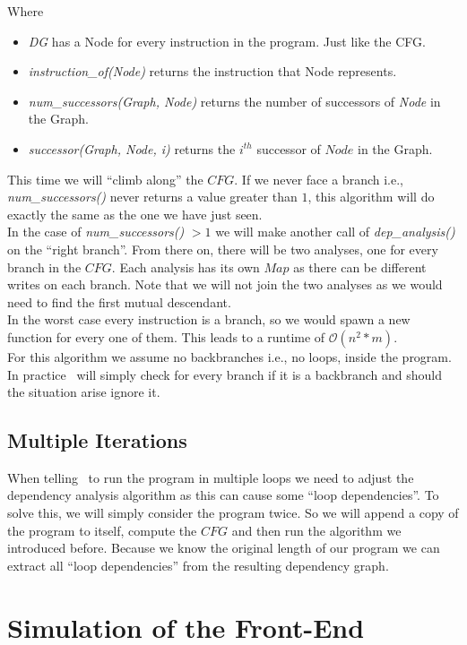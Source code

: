 Where
\begin{itemize}
    \item \emph{DG} has a Node for every instruction in the program. Just like the CFG.
    \item \emph{instruction\_of(Node)} returns the instruction that Node represents.
    \item \emph{num\_successors(Graph, Node)} returns the number of successors of \emph{Node} in the Graph.
    \item \emph{successor(Graph, Node, i)} returns the $i^{th}$ successor of $Node$ in the Graph.
\end{itemize}

This time we will ``climb along'' the $CFG$. If we never face a branch i.e., \emph{num\_successors()} never returns a value greater than $1$, this algorithm will do exactly the same as the one we have just seen.\\
In the case of \emph{num\_successors()} $> 1$ we will make another call of \emph{dep\_analysis()} on the ``right branch''. From there on, there will be two analyses, one for every branch in the $CFG$. Each analysis has its own $Map$ as there can be different writes on each branch. Note that we will not join the two analyses as we would need to find the first mutual descendant.\\
In the worst case every instruction is a branch, so we would spawn a new function for every one of them. This leads to a runtime of $\mathcal{O}(n^2*m)$.\\
For this algorithm we assume no backbranches i.e., no loops, inside the program. In practice \suaca\ will simply check for every branch if it is a backbranch and should the situation arise ignore it.


\subsection{Multiple Iterations}

When telling \suaca\ to run the program in multiple loops we need to adjust the dependency analysis algorithm as this can cause some ``loop dependencies''. To solve this, we will simply consider the program twice. So we will append a copy of the program to itself, compute the $CFG$ and then run the algorithm we introduced before. Because we know the original length of our program we can extract all ``loop dependencies'' from the resulting dependency graph.


\section{Simulation of the Front-End}
\label{sec:simfrontend}

